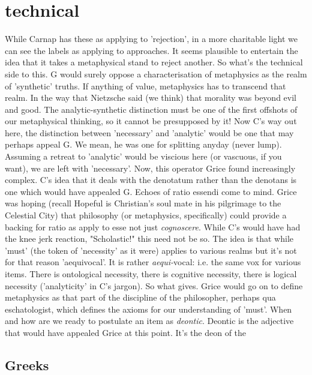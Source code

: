 \documentclass[10pt,titlepage]{book}
\begin{document}
\section{technical}

While Carnap has these as applying to 'rejection', in a more  
charitable light we can see the labels as applying to approaches. It seems  
plausible to entertain the idea that it takes a metaphysical stand to reject  
another. So what's the technical side to this. G would surely oppose a  
characterisation of metaphysics as the realm of 'synthetic' truths. If anything  
of value, metaphysics has to transcend that realm. In the way that 
Nietzsche  said (we think) that morality was beyond evil and good. The 
analytic-synthetic  distinction must be one of the first offshots of our metaphysical 
thinking, so  it cannot be presupposed by it! Now C's way out here, the 
distinction between  'necessary' and 'analytic' would be one that may perhaps 
appeal G. We mean, he  was one for splitting anyday (never lump). Assuming a 
retreat to 'analytic'  would be viscious here (or vascuous, if you want), we 
are left with 'necessary'.  Now, this operator Grice found increasingly 
complex. C's idea that it deals with  the denotatum rather than the denotans is 
one which would have appealed G.  Echoes of ratio essendi come to mind. Grice 
was hoping (recall Hopeful is  Christian's soul mate in his pilgrimage to 
the Celestial City) that philosophy  (or metaphysics, specifically) could 
provide a backing for ratio as apply to  esse not just {\it cognoscere}. While 
C's would have had the knee jerk reaction,  "Scholastic!" this need not be so. 
The idea is that while 'must' (the token of  'necessity' as it were) 
applies to various realms but it's not for that reason  'aequivocal'. It is rather 
{\it aequi-}vocal: i.e. the same vox for various items.  There is ontological 
necessity, there is cognitive necessity, there is logical  necessity 
('analyticity' in C's jargon). So what gives. Grice would go on to  define 
metaphysics as that part of the discipline of the philosopher, perhaps  qua 
eschatologist, which defines the axioms for our understanding of 'must'.  When and 
how are we ready to postulate an item as {\it deontic}. Deontic is the  
adjective that would have appealed Grice at this point. It's the deon of the  

\subsection{Greeks}
\end{document}
